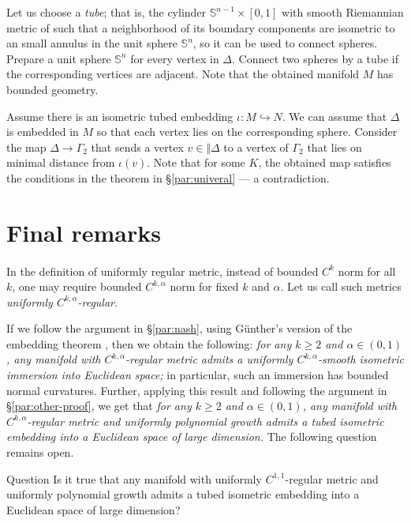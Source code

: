 \documentclass[a4paper,10pt]{article}
\begin{document}
Let us choose a \emph{tube}; that is, the cylinder $\mathbb{S}^{n-1}\times [0,1]$ with smooth Riemannian metric of such that a neighborhood of its boundary components are isometric to an small annulus in the unit sphere $\mathbb{S}^n$, so it can be used to connect spheres.
Prepare a unit sphere $\mathbb{S}^n$ for every vertex in $\Delta$.
Connect two spheres by a tube if the corresponding vertices are adjacent.
Note that the obtained manifold $M$ has bounded geometry.

Assume there is an isometric tubed embedding $\iota\colon M\hookrightarrow N$.
We can assume that $\Delta$ is embedded in $M$ so that each vertex lies on the corresponding sphere.
Consider the map $\Delta\to \Gamma_2$ that sends a vertex $v\in \Vert \Delta$ to a vertex of $\Gamma_2$ that lies on minimal distance from $\iota(v)$.
Note that for some $K$, the obtained map satisfies the conditions in the theorem in §\ref{par:univeral} --- a contradiction.
\qeds





\section*{Final remarks}


\paragraph{}\label{par:remarks}

In the definition of uniformly regular metric,
instead of bounded $C^k$ norm for all $k$,
one may require bounded $C^{k,\alpha}$ norm for fixed $k$ and $\alpha$.
Let us call such metrics \emph{uniformly $C^{k,\alpha}$-regular}.

If we follow the argument in §\ref{par:nash}, using Günther's version of the embedding theorem \cite{guenther},
then we obtain the following: \textit{for any $k\ge 2$ and $\alpha\in(0,1)$, any manifold with $C^{k,\alpha}$-regular metric admits a uniformly $C^{k,\alpha}$-smooth isometric immersion into Euclidean space;}
in particular, such an immersion has bounded normal curvatures.
Further, applying this result and following the argument in §\ref{par:other-proof}, we get that
\textit{for any $k\ge 2$ and $\alpha\in(0,1)$, any manifold with $C^{k,\alpha}$-regular metric and uniformly polynomial growth admits a tubed isometric embedding into a Euclidean space of large dimension.}
The following question remains open.

\begin{thm}{Question}
Is it true that any manifold with uniformly $C^{1,1}$-regular metric and uniformly polynomial growth admits a tubed isometric embedding into a Euclidean space of large dimension?
\end{thm}
\end{document}
